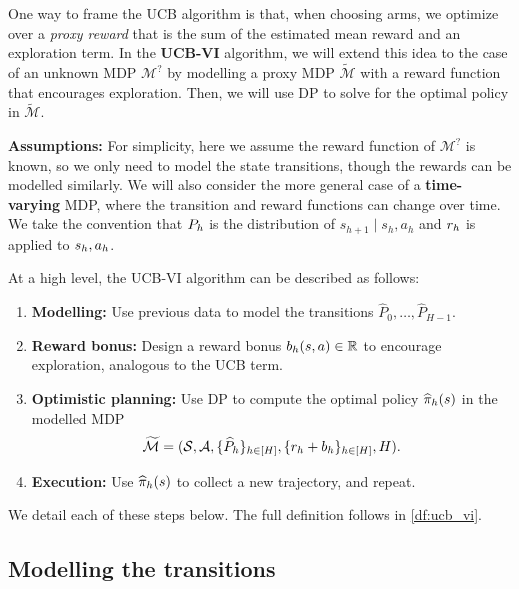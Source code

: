 \documentclass[\main/main]{subfiles}
\begin{document}
One way to frame the UCB algorithm is that, when choosing arms, we optimize over a \emph{proxy reward} that is the sum of the estimated mean reward and an exploration term.
In the \textbf{UCB-VI} algorithm, we will extend this idea to the case of an unknown MDP $\mathcal{M}^{?}$ by modelling a proxy MDP $\tilde{\mathcal{M}}$ with a reward function that encourages exploration. Then, we will use DP to solve for the optimal policy in $\tilde{\mathcal{M}}$.

\textbf{Assumptions:} For simplicity, here we assume the reward function of $\mathcal{M}^{?}$ is known, so we only need to model the state transitions, though the rewards can be modelled similarly. We will also consider the more general case of a \textbf{time-varying} MDP, where the transition and reward functions can change over time. We take the convention that $P_h$ is the distribution of $s_{h+1} \mid s_{h}, a_{h}$ and $r_h$ is applied to $s_h, a_h$.

At a high level, the UCB-VI algorithm can be described as follows:

\begin{enumerate}
    \item \textbf{Modelling:} Use previous data to model the transitions $\hat{P}_0, \dots, \hat{P}_{H-1}$.
    \item \textbf{Reward bonus:} Design a reward bonus $b_h(s, a) \in \mathbb{R}$ to encourage exploration, analogous to the UCB term.
    \item \textbf{Optimistic planning:} Use DP to compute the optimal policy $\widehat \pi_h(s)$ in the modelled MDP \[ \widetilde{\mathcal{M}} = (\mathcal{S}, \mathcal{A}, \{ \widehat{P}_h \}_{h \in [H]}, \{ r_h + b_h \}_{h \in [H]}, H). \]
    \item \textbf{Execution:} Use $\widehat \pi_h(s)$ to collect a new trajectory, and repeat.
\end{enumerate}

We detail each of these steps below. The full definition follows in \eqref{df:ucb_vi}.


\subsection{Modelling the transitions}

\end{document}
